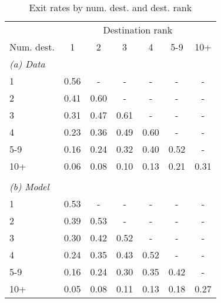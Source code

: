 \begin{table}[h!]
\footnotesize
\renewcommand{\arraystretch}{1.2}
\begin{center}
\begin{threeparttable}
\caption{Exit rates by num. dest. and dest. rank}
\label{tab:exit_by_nd_drank}
\begin{tabular}{lcccccc}
\toprule
&\multicolumn{6}{c}{Destination rank}\\
\cmidrule(rl){2-7}
Num. dest.&1&2&3&4&5-9&10+\\
\midrule
\multicolumn{7}{l}{\textit{(a) Data}}\\
1& 0.56& -& -& -& -& -\\
2& 0.41& 0.60& -& -& -& -\\
3& 0.31& 0.47& 0.61& -& -& -\\
4& 0.23& 0.36& 0.49& 0.60& -& -\\
5-9& 0.16& 0.24& 0.32& 0.40& 0.52& -\\
10+& 0.06& 0.08& 0.10& 0.13& 0.21& 0.31\\
\\
\multicolumn{7}{l}{\textit{(b) Model}}\\
1& 0.53& -& -& -& -& -\\
2& 0.39& 0.53& -& -& -& -\\
3& 0.30& 0.42& 0.52& -& -& -\\
4& 0.24& 0.35& 0.43& 0.52& -& -\\
5-9& 0.16& 0.24& 0.30& 0.35& 0.42& -\\
10+& 0.05& 0.08& 0.11& 0.13& 0.18& 0.27\\
\bottomrule
\end{tabular}
\end{threeparttable}
\end{center}
\normalsize
\end{table}
